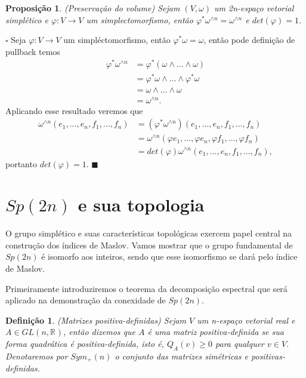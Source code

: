 \documentclass[12pt]{book}
\newtheorem{definicao}[teorema]{Definição}
\newtheorem{proposicao}[teorema]{Proposição}
\newenvironment{prova}[1]{$\square$ #1}{\hfill$\blacksquare$}
\newcommand{\generalgroup}[2]{GL(#1, #2)}
\newcommand{\generalgroupreal}[1]{\generalgroup{#1}{\real{}}}
\newcommand{\gruposimpletico}[1]{Sp(#1)}
\newcommand{\matrizsimetricapositiva}[1]{Sym_{+}(#1)}
\newcommand{\real}[1]{\mathbb{R}^{#1}}
\begin{document}
	\begin{proposicao}\label{proposicao_preservacao_volume}
		(Preservação do volume) Sejam $(V,\omega)$ um 2n-espaço vetorial simplético e $\varphi:V\to V$ um simplectomorfismo, então $\varphi^{*}\omega^{\wedge n}=\omega^{\wedge n}$ e $det(\varphi)=1$.
	\end{proposicao}
	\begin{prova}
		Seja $\varphi:V \to V$ um simpléctomorfismo, então $\varphi^{*}\omega = \omega$, então pode definição de pullback temos
		$$
		\begin{aligned}
			\varphi^{*}\omega^{\wedge n} 
			&= 
			\varphi^{*}(\omega\wedge \dots \wedge\omega) 
			\\
			&= \varphi^{*}\omega\wedge \dots \wedge\varphi^{*}\omega
			\\
			&=\omega\wedge \dots \wedge \omega 
			\\
			&= \omega^{\wedge n}.
		\end{aligned} 
		$$
		Aplicando esse resultado veremos que
		$$
		\begin{aligned}
		\omega^{\wedge n}(e_{1}, \dots,e_{n}, f_{1},\dots, f_{n})
		&=(\varphi^{*}\omega^{\wedge n})(e_{1}, \dots, e_{n}, f_{1},\dots, f_{n})
		\\
		&=
		\omega^{\wedge n}(\varphi e_{1}, \dots,\varphi  e_{n}, \varphi f_{1},\dots, \varphi f_{n})
		\\
		&=det(\varphi)\omega^{\wedge n}(e_{1}, \dots, e_{n}, f_{1},\dots, f_{n}),
		\end{aligned}
		$$
		portanto $det(\varphi) = 1$.
	\end{prova}
	
	\section{$\gruposimpletico{2n}$ e sua topologia}
	O grupo simplético e suas características topológicas exercem papel central na construção dos índices de Maslov. Vamos mostrar que o grupo fundamental de $Sp(2n)$ é isomorfo aos inteiros, sendo que esse isomorfismo se dará pelo índice de Maslov.

	Primeiramente introduziremos o teorema da decomposição espectral que será aplicado na demonstração da conexidade de $\gruposimpletico{2n}$.
	
	\begin{definicao}\label{definicao_matriz_positiva_definida}
		(Matrizes positiva-definidas) Sejam $V$ um n-espaço vetorial real  e $A \in \generalgroupreal{n}$, então dizemos que $A$ é uma matriz positiva-definida se sua forma quadrática é positiva-definida, isto é, $Q_{A}(v)\ge 0$ para qualquer $v\in V$. Denotaremos por $\matrizsimetricapositiva{n}$ o conjunto das matrizes simétricas e positivas-definidas.
	\end{definicao}
	
\end{document}
